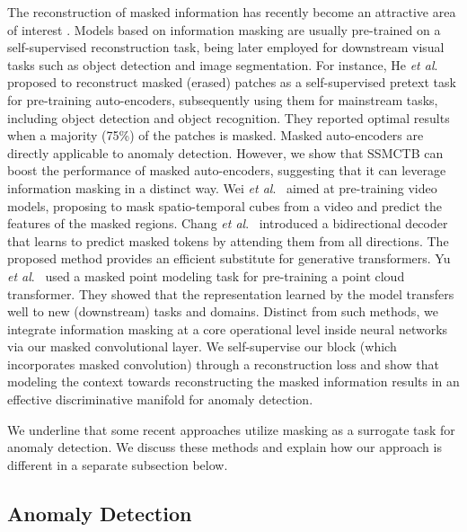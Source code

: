 \documentclass[10pt,journal,compsoc]{IEEEtran}
\newcommand{\etal}{\textit{et al}.}
\begin{document}
The reconstruction of masked information has recently become an attractive area of interest \cite{He-CVPR-2022, Pathak-CVPR-2016, Wei-CVPR-2022, Chang-CVPR-2022, Yu-CVPR-2022}. Models based on information masking are usually pre-trained on a self-supervised reconstruction task, being later employed for downstream visual tasks such as object detection and image segmentation. For instance, He \etal~\cite{He-CVPR-2022} proposed to reconstruct masked (erased) patches as a self-supervised pretext task for pre-training auto-encoders, subsequently using them for mainstream tasks, including object detection and object recognition. They reported optimal results when a majority (75\%) of the patches is masked. Masked auto-encoders are directly applicable to anomaly detection. However, we show that SSMCTB can boost the performance of masked auto-encoders, suggesting that it can leverage information masking in a distinct way. Wei \etal~\cite{Wei-CVPR-2022} aimed at pre-training video models, proposing to mask spatio-temporal cubes from a video and predict the features of the masked regions. Chang \etal~\cite{Chang-CVPR-2022} introduced a bidirectional decoder that learns to predict masked tokens by attending them from all directions. The proposed method provides an efficient substitute for generative transformers. 
Yu \etal~\cite{Yu-CVPR-2022} used a masked point modeling task for pre-training a point cloud transformer. They showed that the representation learned by the model transfers well to new (downstream) tasks and domains. Distinct from such methods, we integrate information masking at a core operational level inside neural networks via our masked convolutional layer. We self-supervise our block (which incorporates masked convolution) through a reconstruction loss and show that modeling the context towards reconstructing the masked information results in an effective discriminative manifold for anomaly detection.

We underline that some recent approaches \cite{Georgescu-CVPR-2021, Astrid-ICCVW-2021, Liu-CVPR-2018} utilize masking as a surrogate task for anomaly detection. We discuss these methods and explain how our approach is different in a separate subsection below. 

\subsection{Anomaly Detection}
\end{document}
